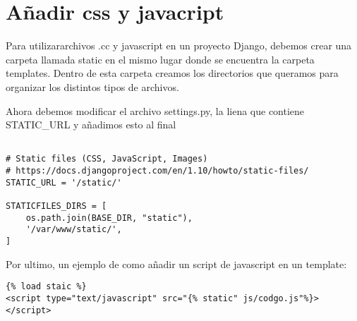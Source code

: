 \section{Añadir css y javacript}

Para utilizararchivos .cc y javascript en un proyecto Django, debemos crear una carpeta
llamada static en el mismo lugar donde se encuentra la carpeta templates. Dentro de esta
carpeta creamos los directorios que queramos para organizar los distintos tipos de archivos.

Ahora debemos modificar el archivo settings.py, la liena que contiene STATIC\_URL y añadimos
esto al final

\lstset{
  language=Python
}
\begin{lstlisting}

# Static files (CSS, JavaScript, Images)
# https://docs.djangoproject.com/en/1.10/howto/static-files/
STATIC_URL = '/static/'

STATICFILES_DIRS = [
    os.path.join(BASE_DIR, "static"),
    '/var/www/static/',
]

\end{lstlisting}

Por ultimo, un ejemplo de como añadir un script de javascript en un template:

\lstset{
  language=HTML
}
\begin{lstlisting}
{% load staic %}
<script type="text/javascript" src="{% static" js/codgo.js"%}></script>

\end{lstlisting}